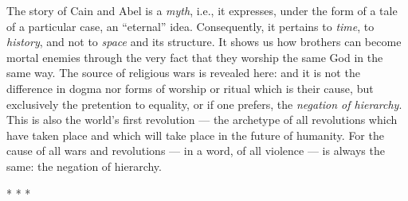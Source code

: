 \begin{quotex}
The story of Cain and Abel is a \emph{myth}, i.e., it expresses, under the form of a tale of a particular case, an ``eternal'' idea. Consequently, it pertains to \emph{time}, to \emph{history}, and not to \emph{space} and its structure. It shows us how brothers can become mortal enemies through the very fact that they worship the same God in the same way. The source of religious wars is revealed here: and it is not the difference in dogma nor forms of worship or ritual which is their cause, but exclusively the pretention to equality, or if one prefers, the \emph{negation of hierarchy}. This is also the world's first revolution --- the archetype of all revolutions which have taken place and which will take place in the future of humanity. For the cause of all wars and revolutions --- in a word, of all violence --- is always the same: the negation of hierarchy.
\end{quotex}




\begin{center}* * *\end{center}

